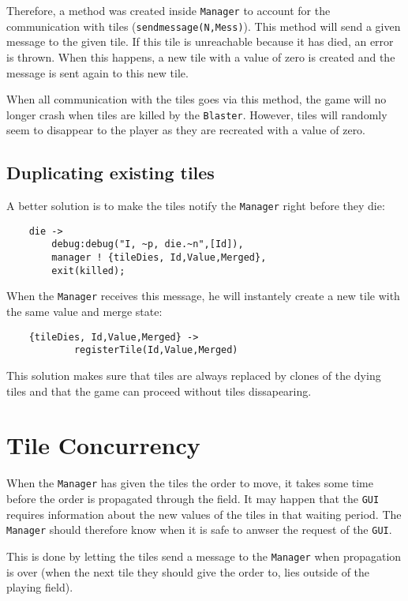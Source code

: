 \documentclass{taak}
\begin{document}
Therefore, a method was created inside \texttt{Manager} to account for the communication with tiles (\texttt{sendmessage(N,Mess)}). This method will send a given message to the given tile. If this tile is unreachable because it has died, an error is thrown. When this happens, a new tile with a value of zero is created and the message is sent again to this new tile.

When all communication with the tiles goes via this method, the game will no longer crash when tiles are killed by the \texttt{Blaster}. However, tiles will randomly seem to disappear to the player as they are recreated with a value of zero.

\subsection{Duplicating existing tiles}
A better solution is to make the tiles notify the \texttt{Manager} right before they die:

\begin{lstlisting}
    die ->
        debug:debug("I, ~p, die.~n",[Id]),
        manager ! {tileDies, Id,Value,Merged},
        exit(killed);
\end{lstlisting}

When the \texttt{Manager} receives this message, he will instantely create a new tile with the same value and merge state:

\begin{lstlisting}
    {tileDies, Id,Value,Merged} ->
			registerTile(Id,Value,Merged)
\end{lstlisting}

This solution makes sure that tiles are always replaced by clones of the dying tiles and that the game can proceed without tiles dissapearing.

\section{Tile Concurrency}
When the \texttt{Manager} has given the tiles the order to move, it takes some time before the order is propagated through the field. It may happen that the \texttt{GUI} requires information about the new values of the tiles in that waiting period. The \texttt{Manager} should therefore know when it is safe to anwser the request of the \texttt{GUI}.

This is done by letting the tiles send a message to the \texttt{Manager} when propagation is over (when the next tile they should give the order to, lies outside of the playing field).
\end{document}

